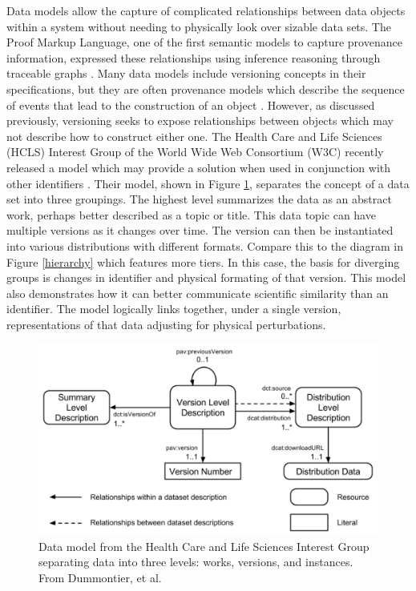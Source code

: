 Data models allow the capture of complicated relationships between data objects within a system without needing to physically look over sizable data sets.
The Proof Markup Language, one of the first semantic models to capture provenance information, expressed these relationships using inference reasoning through traceable graphs \cite{daSilva2006381}.
Many data models include versioning concepts in their specifications, but they are often provenance models which describe the sequence of events that lead to the construction of an object \cite{dai2014provenance}.
However, as discussed previously, versioning seeks to expose relationships between objects which may not describe how to construct either one.
The Health Care and Life Sciences (HCLS) Interest Group of the World Wide Web Consortium (W3C) recently released a model which may provide a solution when used in conjunction with other identifiers \cite{Dummontier2016}.
Their model, shown in Figure \ref{HCLSModel}, separates the concept of a data set into three groupings.
The highest level summarizes the data as an abstract work, perhaps better described as a topic or title.
This data topic can have multiple versions as it changes over time.
The version can then be instantiated into various distributions with different formats.
Compare this to the diagram in Figure \ref{hierarchy} which features more tiers.
In this case, the basis for diverging groups is changes in identifier and physical formating of that version.
This model also demonstrates how it can better communicate scientific similarity than an identifier.
The model logically links together, under a single version, representations of that data adjusting for physical perturbations.

\begin{figure}%
	\centering
	\includegraphics[scale=0.35]{figures/HCLSModel.png}
	\caption[Data model from the Health Care and Life Sciences Interest Group separating data into three levels: works, versions, and instances.]{Data model from the Health Care and Life Sciences Interest Group separating data into three levels: works, versions, and instances.  From Dummontier, et al. \cite{Dummontier2016}}
	\label{HCLSModel}
\end{figure}

